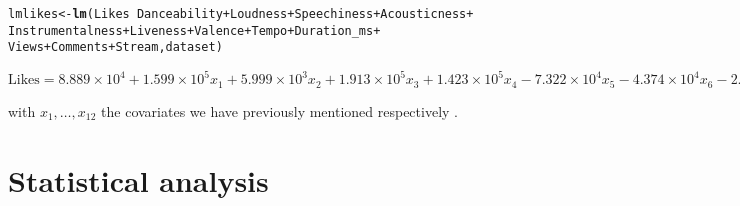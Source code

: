 \documentclass[11pt]{article}\usepackage[]{graphicx}\usepackage[]{xcolor}
\makeatletter
\newcommand{\hlopt}[1]{\textcolor[rgb]{0,0,0}{#1}}%
\newcommand{\hldef}[1]{\textcolor[rgb]{0.345,0.345,0.345}{#1}}%
\newcommand{\hlkwb}[1]{\textcolor[rgb]{0.69,0.353,0.396}{#1}}%
\newcommand{\hlkwd}[1]{\textcolor[rgb]{0.737,0.353,0.396}{\textbf{#1}}}%
\newenvironment{kframe}{%
 \def\at@end@of@kframe{}%
 \ifinner\ifhmode%
  \def\at@end@of@kframe{\end{minipage}}%
  \begin{minipage}{\columnwidth}%
 \fi\fi%
 \def\FrameCommand##1{\hskip\@totalleftmargin \hskip-\fboxsep
 \colorbox{shadecolor}{##1}\hskip-\fboxsep
     \hskip-\linewidth \hskip-\@totalleftmargin \hskip\columnwidth}%
 \MakeFramed {\advance\hsize-\width
   \@totalleftmargin\z@ \linewidth\hsize
   \@setminipage}}%
 {\par\unskip\endMakeFramed%
 \at@end@of@kframe}
\newenvironment{knitrout}{}{} %
\makeatother
\begin{document}
\begin{knitrout}
\color{fgcolor}\begin{kframe}
\begin{alltt}
\hldef{lmlikes} \hlkwb{<-} \hlkwd{lm}\hldef{(Likes}\hlopt{~}\hldef{Danceability}\hlopt{+}\hldef{Loudness}\hlopt{+} \hldef{Speechiness}\hlopt{+}\hldef{Acousticness}\hlopt{+}
                \hldef{Instrumentalness}\hlopt{+}\hldef{Liveness}\hlopt{+}\hldef{Valence}\hlopt{+}\hldef{Tempo}\hlopt{+}\hldef{Duration_ms}\hlopt{+}
                \hldef{Views}\hlopt{+}\hldef{Comments}\hlopt{+}\hldef{Stream ,dataset)}
\end{alltt}
\end{kframe}
\end{knitrout}

$ \text{Likes} = 8.889\times10^4 + 1.599\times 10^5 x_1 + 5.999\times 10^3 x_2 +
1.913\times 10^5 x_3 + 1.423\times 10^5 x_4 - 7.322 \times 10^4 x_5 -4.374\times
10^4 x_6 -2.133 \times 10^5 x_7 - 1.880 \times 10^2 x_8 + 1.499 \times 10^{-2}x_9+
4.494\times 10^3 x_{10} + 4.306\times x_{11} + 1.479\times 10^3 x_{12} $


with $x_1, \dots, x_{12}$ the covariates we have previously mentioned respectively .

\section{Statistical analysis}
\end{document}
